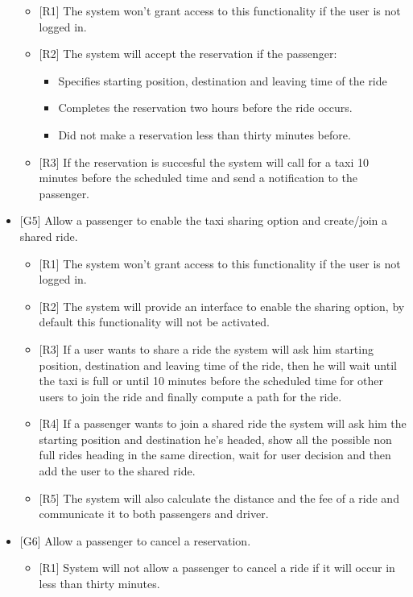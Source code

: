 \documentclass[a4paper, 12pt, titlepage]{article}
\begin{document}
\begin{itemize}
			\begin{itemize}
				\item {[R1]} The system won't grant access to this functionality if the user is not logged in.
				\item {[R2]} The system will accept the reservation if the passenger: 
				\begin{itemize}
					\item Specifies starting position, destination and leaving time of the ride
					\item Completes the reservation two hours before the ride occurs.
					\item Did not make a reservation less than thirty minutes before.
				\end{itemize}
				\item {[R3]} If the reservation is succesful the system will call for a taxi 10 minutes before the scheduled time and send a notification to the passenger.
			\end{itemize}
		\item {[G5]} Allow a passenger to enable the taxi sharing option and create/join a shared ride.
			\begin{itemize}
				\item {[R1]} The system won't grant access to this functionality if the user is not logged in.
				\item {[R2]} The system will provide an interface to enable the sharing option, by default this functionality will not be activated.
				\item {[R3]} If a user wants to share a ride the system will ask him starting position, destination and leaving time of the ride, then he will wait until the taxi is full or until 10 minutes before the scheduled time for other users to join the ride and finally compute a path for the ride.
				\item {[R4]} If a passenger wants to join a shared ride the system will ask him the starting position and destination he's headed, show all the possible non full rides heading in the same direction, wait for user decision and then add the user to the shared ride.
				\item {[R5]} The system will also calculate the distance and the fee of a ride and communicate it to both passengers and driver.
			\end{itemize}
		\item {[G6]} Allow a passenger to cancel a reservation.
			\begin{itemize}
				\item {[R1]} System will not allow a passenger to cancel a ride if it will occur in less than thirty minutes.

\end{itemize}
\end{itemize}
\end{document}
